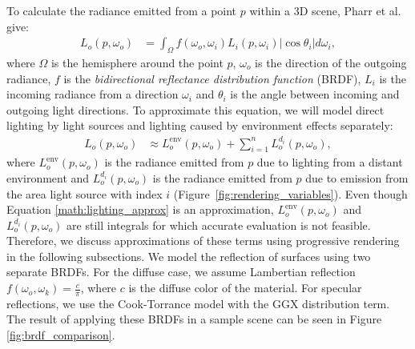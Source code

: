 \documentclass[sigconf,authorversion]{acmart}
\begin{document}
To calculate the radiance emitted from a point $p$ within a 3D scene, Pharr et al. \cite{pharr2016physically} give:
\begin{align}
    L_o(p, \omega_o) &= \int_\Omega f(\omega_o, \omega_i) L_i(p, \omega_i) \left|\cos \theta_i\right| d\omega_i,
\end{align}
where $\Omega$ is the hemisphere around the point $p$, $\omega_o$ is the direction of the outgoing radiance, $f$ is the \emph{bidirectional reflectance distribution function} (BRDF), $L_i$ is the incoming radiance from a direction $\omega_i$ and $\theta_i$ is the angle between incoming and outgoing light directions.
To approximate this equation, we will model direct lighting by light sources and lighting caused by environment effects separately:
\begin{align}
    L_o(p, \omega_o) &\approx L_o^\text{env}(p, \omega_o) + \sum_{i = 1}^n L_o^{d_i}(p, \omega_o), \label{math:lighting_approx}
\end{align}
where $L_o^\text{env}(p, \omega_o)$ is the radiance emitted from $p$ due to lighting from a distant environment and $L_o^{d_i}(p, \omega_o)$ is the radiance emitted from $p$ due to emission from the area light source with index $i$ (Figure~\ref{fig:rendering_variables}).
Even though Equation \ref{math:lighting_approx} is an approximation, $L_o^\text{env}(p, \omega_o)$ and $L_o^{d_i}(p, \omega_o)$ are still integrals for which accurate evaluation is not feasible.
Therefore, we discuss approximations of these terms using progressive rendering in the following subsections.
We model the reflection of surfaces using two separate BRDFs.
For the diffuse case, we assume Lambertian reflection $f(\omega_o, \omega_k) = \frac{c}{\pi}$, where $c$ is the diffuse color of the material.
For specular reflections, we use the Cook-Torrance model with the GGX distribution term.
The result of applying these BRDFs in a sample scene can be seen in Figure \ref{fig:brdf_comparison}.
\end{document}
